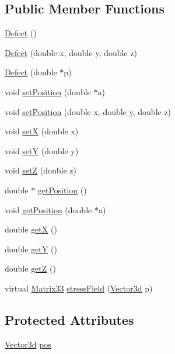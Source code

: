 \subsection*{\-Public \-Member \-Functions}
\begin{DoxyCompactItemize}
\item 
\hyperlink{classDefect_afc84dd2d7250a01746ee67b002dbbad9}{\-Defect} ()
\item 
\hyperlink{classDefect_aaddcb1db4b47037adf2e495665f41bab}{\-Defect} (double x, double y, double z)
\item 
\hyperlink{classDefect_a5bd123214102a5115c46b0a15653d29b}{\-Defect} (double $\ast$p)
\item 
void \hyperlink{classDefect_a2d233d13a8a93f6fba463a1fbc1c6c9f}{set\-Position} (double $\ast$a)
\item 
void \hyperlink{classDefect_ad1a6acd8399d2ecabb7ce2b77623bbec}{set\-Position} (double x, double y, double z)
\item 
void \hyperlink{classDefect_a5a65f73da6a572d9e7109b31239e441d}{set\-X} (double x)
\item 
void \hyperlink{classDefect_a268606391a4eaee3de029d2005648b6f}{set\-Y} (double y)
\item 
void \hyperlink{classDefect_abb0b16c44a1b04d782f5c5f598b49d5b}{set\-Z} (double z)
\item 
double $\ast$ \hyperlink{classDefect_a6842fba3ad14032766ccf0437afcbced}{get\-Position} ()
\item 
void \hyperlink{classDefect_aace5c752b85c368631746abc3d5bd714}{get\-Position} (double $\ast$a)
\item 
double \hyperlink{classDefect_a01b96c453c13db82b5835682e1849dc0}{get\-X} ()
\item 
double \hyperlink{classDefect_a9ea8df3b4c621762a327813056e63911}{get\-Y} ()
\item 
double \hyperlink{classDefect_a6f59edeca7ca8bfa01c54fd6b1a62374}{get\-Z} ()
\item 
virtual \hyperlink{classMatrix33}{\-Matrix33} \hyperlink{classDefect_a2a2c8170e7fa9e2247527291483ce586}{stress\-Field} (\hyperlink{classVector3d}{\-Vector3d} p)
\end{DoxyCompactItemize}
\subsection*{\-Protected \-Attributes}
\begin{DoxyCompactItemize}
\item 
\hyperlink{classVector3d}{\-Vector3d} \hyperlink{classDefect_aed2731c1beefc22e3db6ad5b18194cdd}{pos}
\end{DoxyCompactItemize}


